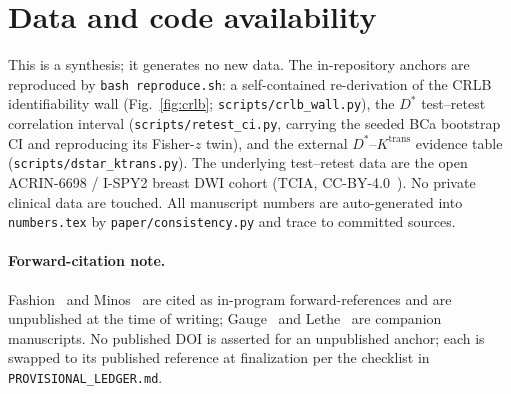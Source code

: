 \documentclass[11pt]{article}
\newcommand{\Dstar}{D^{*}}
\begin{document}
\section*{Data and code availability}
This is a synthesis; it generates no new data. The in-repository anchors are reproduced by
\texttt{bash reproduce.sh}: a self-contained re-derivation of the CRLB identifiability wall
(Fig.~\ref{fig:crlb}; \texttt{scripts/crlb\_wall.py}), the $\Dstar$ test--retest correlation
interval (\texttt{scripts/retest\_ci.py}, carrying the seeded BCa bootstrap CI and reproducing
its Fisher-$z$ twin), and the external $\Dstar$--$K^{\mathrm{trans}}$ evidence table
(\texttt{scripts/dstar\_ktrans.py}). The underlying test--retest data are the open ACRIN-6698 /
I-SPY2 breast DWI cohort (TCIA, CC-BY-4.0~\citep{acrin6698}). No private clinical data are
touched. All manuscript numbers are auto-generated into \texttt{numbers.tex} by
\texttt{paper/consistency.py} and trace to committed sources.

\paragraph{Forward-citation note.}
Fashion~\citep{fashion} and Minos~\citep{minos} are cited as in-program forward-references and are
unpublished at the time of writing; Gauge~\citep{gauge} and Lethe~\citep{lethe} are companion
manuscripts. No published DOI is asserted for an unpublished anchor; each is swapped to its
published reference at finalization per the checklist in \texttt{PROVISIONAL\_LEDGER.md}.



\end{document}
